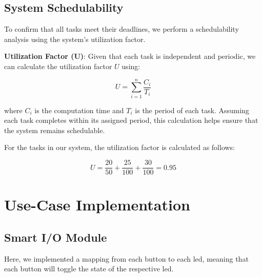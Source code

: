 \documentclass[a4paper,12pt]{article}
\begin{document}
\subsection{System Schedulability}
To confirm that all tasks meet their deadlines, we perform a schedulability analysis using the system's utilization factor.

\textbf{Utilization Factor (U)}: Given that each task is independent and periodic, we can calculate the utilization factor \( U \) using:

\[
U = \sum_{i=1}^n \frac{C_i}{T_i}
\]

where \( C_i \) is the computation time and \( T_i \) is the period of each task. Assuming each task completes within its assigned period, this calculation helps ensure that the system remains schedulable.

For the tasks in our system, the utilization factor is calculated as follows:

\[
U = \frac{20}{50} + \frac{25}{100} + \frac{30}{100} = 0.95 
\]


\section{Use-Case Implementation}
\subsection{Smart I/O Module}
Here, we implemented a mapping from each button to each led, meaning that each button will toggle the state of the respective led.
\end{document}
